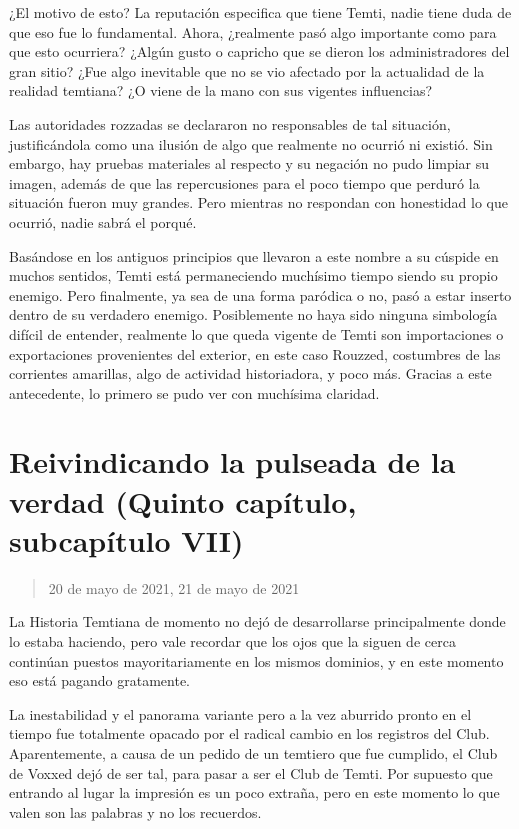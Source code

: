 \documentclass[
  spanish,
]{book}
\begin{document}
¿El motivo de esto? La reputación especifica que tiene Temti, nadie tiene duda de que eso fue lo fundamental. Ahora, ¿realmente pasó algo importante como para que esto ocurriera? ¿Algún gusto o capricho que se dieron los administradores del gran sitio? ¿Fue algo inevitable que no se vio afectado por la actualidad de la realidad temtiana? ¿O viene de la mano con sus vigentes influencias?

Las autoridades rozzadas se declararon no responsables de tal situación, justificándola como una ilusión de algo que realmente no ocurrió ni existió. Sin embargo, hay pruebas materiales al respecto y su negación no pudo limpiar su imagen, además de que las repercusiones para el poco tiempo que perduró la situación fueron muy grandes. Pero mientras no respondan con honestidad lo que ocurrió, nadie sabrá el porqué.

Basándose en los antiguos principios que llevaron a este nombre a su cúspide en muchos sentidos, Temti está permaneciendo muchísimo tiempo siendo su propio enemigo. Pero finalmente, ya sea de una forma paródica o no, pasó a estar inserto dentro de su verdadero enemigo. Posiblemente no haya sido ninguna simbología difícil de entender, realmente lo que queda vigente de Temti son importaciones o exportaciones provenientes del exterior, en este caso Rouzzed, costumbres de las corrientes amarillas, algo de actividad historiadora, y poco más. Gracias a este antecedente, lo primero se pudo ver con muchísima claridad.

\hypertarget{reivindicando-la-pulseada-de-la-verdad-quinto-capuxedtulo-subcapuxedtulo-vii}{%
\section{Reivindicando la pulseada de la verdad (Quinto capítulo, subcapítulo VII)}\label{reivindicando-la-pulseada-de-la-verdad-quinto-capuxedtulo-subcapuxedtulo-vii}}

\begin{quote}
20 de mayo de 2021, 21 de mayo de 2021
\end{quote}

La Historia Temtiana de momento no dejó de desarrollarse principalmente donde lo estaba haciendo, pero vale recordar que los ojos que la siguen de cerca continúan puestos mayoritariamente en los mismos dominios, y en este momento eso está pagando gratamente.

La inestabilidad y el panorama variante pero a la vez aburrido pronto en el tiempo fue totalmente opacado por el radical cambio en los registros del Club. Aparentemente, a causa de un pedido de un temtiero que fue cumplido, el Club de Voxxed dejó de ser tal, para pasar a ser el Club de Temti. Por supuesto que entrando al lugar la impresión es un poco extraña, pero en este momento lo que valen son las palabras y no los recuerdos.
\end{document}
